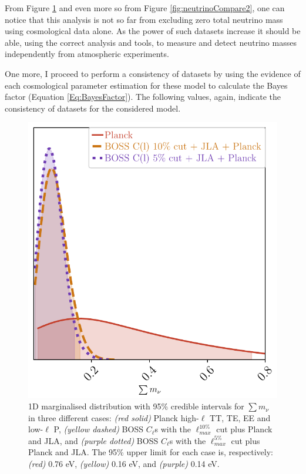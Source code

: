 \qquad From Figure \ref{fig:neutrinoCompare1} and even more so from Figure \ref{fig:neutrinoCompare2}, one can notice that this analysis is not so far from excluding zero total neutrino mass using cosmological data alone. As the power of such datasets increase it should be able, using the correct analysis and tools, to measure and detect neutrino masses independently from atmospheric experiments.

\qquad One more, I proceed to perform a consistency of datasets by using the evidence of each cosmological parameter estimation for these model to calculate the Bayes factor (Equation \ref{Eq:BayesFactor}). The following values, again, indicate the consistency of datasets for the considered model.
\begin{figure}
\begin{center}
\includegraphics[scale=0.70]{BOSS-FIGS/neutrino_1D.pdf}
\caption[1D marginalised distribution with 95\% credible intervals for $\sum m_{\nu}$.]{1D marginalised distribution with 95\% credible intervals for $\sum m_{\nu}$ in three different cases: \textit{(red solid)} Planck high-$\ell$ TT, TE, EE and low-$\ell$ P, \textit{(yellow dashed)} BOSS $C_{\ell}$s with the $\ell_{max}^{10\%}$ cut plus Planck and JLA, and \textit{(purple dotted)} BOSS $C_{\ell}$s with the $\ell_{max}^{5\%}$ cut plus Planck and JLA. The 95\% upper limit for each case is, respectively: \textit{(red)} 0.76 eV, \textit{(yellow)} 0.16 eV, and \textit{(purple)} 0.14 eV.}
\label{fig:neutrinoCompare1}
\end{center}
\end{figure}
